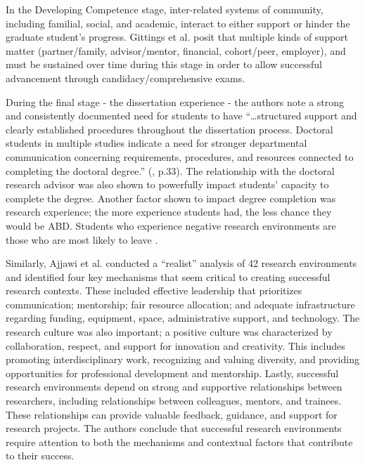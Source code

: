 \documentclass[
  11pt,
]{book}
\begin{document}
In the Developing Competence stage, inter-related systems of community, including familial, social, and academic, interact to either support or hinder the graduate student's progress. Gittings et al. \citeyearpar{gittings_doctoral_2018} posit that multiple kinds of support matter (partner/family, advisor/mentor, financial, cohort/peer, employer), and must be sustained over time during this stage in order to allow successful advancement through candidacy/comprehensive exams.

During the final stage - the dissertation experience - the authors note a strong and consistently documented need for students to have ``\ldots structured support and clearly established procedures throughout the dissertation process. Doctoral students in multiple studies indicate a need for stronger departmental communication concerning requirements, procedures, and resources connected to completing the doctoral degree.'' (\citet{gittings_doctoral_2018}, p.33). The relationship with the doctoral research advisor was also shown to powerfully impact students' capacity to complete the degree. Another factor shown to impact degree completion was research experience; the more experience students had, the less chance they would be ABD. Students who experience negative research environments are those who are most likely to leave \citep{kis_leaving_2022}.

Similarly, Ajjawi et al. \citeyearpar{ajjawi_what_2018} conducted a ``realist'' analysis of 42 research environments and identified four key mechanisms that seem critical to creating successful research contexts. These included effective leadership that prioritizes communication; mentorship; fair resource allocation; and adequate infrastructure regarding funding, equipment, space, administrative support, and technology. The research culture was also important; a positive culture was characterized by collaboration, respect, and support for innovation and creativity. This includes promoting interdisciplinary work, recognizing and valuing diversity, and providing opportunities for professional development and mentorship. Lastly, successful research environments depend on strong and supportive relationships between researchers, including relationships between colleagues, mentors, and trainees. These relationships can provide valuable feedback, guidance, and support for research projects. The authors conclude that successful research environments require attention to both the mechanisms and contextual factors that contribute to their success.
\end{document}
